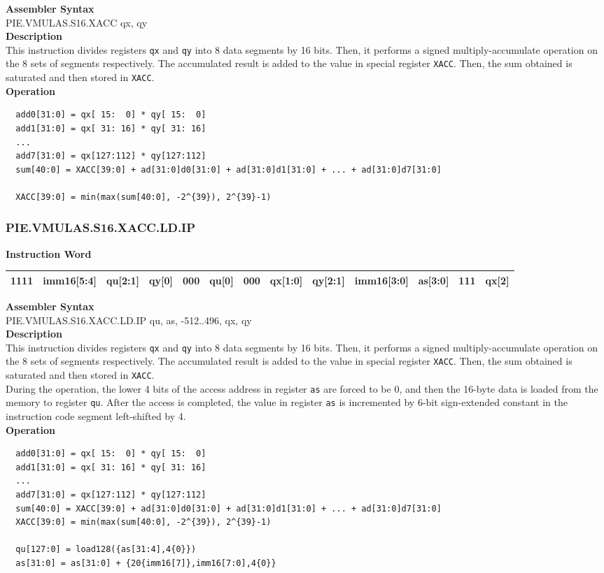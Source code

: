 \textbf{Assembler Syntax} \\
PIE.VMULAS.S16.XACC qx, qy \\
\textbf{Description} \\
This instruction divides registers \lstinline{qx} and \lstinline{qy} into 8 data segments by 16 bits. Then, it performs a signed multiply-accumulate operation on the 8 sets of segments respectively. The accumulated result is added to the value in special register \lstinline{XACC}. Then, the sum obtained is saturated and then stored in \lstinline{XACC}.\\
\textbf{Operation}
\begin{lstlisting}
  add0[31:0] = qx[ 15:  0] * qy[ 15:  0]
  add1[31:0] = qx[ 31: 16] * qy[ 31: 16]
  ...
  add7[31:0] = qx[127:112] * qy[127:112]
  sum[40:0] = XACC[39:0] + ad[31:0]d0[31:0] + ad[31:0]d1[31:0] + ... + ad[31:0]d7[31:0]

  XACC[39:0] = min(max(sum[40:0], -2^{39}), 2^{39}-1)
\end{lstlisting}

\newpage
\subsubsection{PIE.VMULAS.S16.XACC.LD.IP}\label{instruction:PIEVMULASS16XACCLDIP}
\setlength\tabcolsep{6pt}
\textbf{Instruction Word} \\
\begin{tabular}{|c|c|c|c|c|c|c|c|c|c|c|c|c|}
	\hline
	1111 & imm16[5:4] & qu[2:1] & qy[0] & 000 & qu[0] & 000 & qx[1:0] & qy[2:1] & imm16[3:0] & as[3:0] & 111 & qx[2] \\
	\hline
\end{tabular}

\textbf{Assembler Syntax} \\
PIE.VMULAS.S16.XACC.LD.IP qu, as, -512..496, qx, qy \\
\textbf{Description} \\
This instruction divides registers \lstinline{qx} and \lstinline{qy} into 8 data segments by 16 bits. Then, it performs a signed multiply-accumulate operation on the 8 sets of segments respectively. The accumulated result is added to the value in special register \lstinline{XACC}. Then, the sum obtained is saturated and then stored in \lstinline{XACC}. \\ During the operation, the lower 4 bits of the access address in register \lstinline{as} are forced to be 0, and then the 16-byte data is loaded from the memory to register \lstinline{qu}. After the access is completed, the value in register \lstinline{as} is incremented by 6-bit sign-extended constant in the instruction code segment left-shifted by 4.\\
\textbf{Operation}
\begin{lstlisting}
  add0[31:0] = qx[ 15:  0] * qy[ 15:  0]
  add1[31:0] = qx[ 31: 16] * qy[ 31: 16]
  ...
  add7[31:0] = qx[127:112] * qy[127:112]
  sum[40:0] = XACC[39:0] + ad[31:0]d0[31:0] + ad[31:0]d1[31:0] + ... + ad[31:0]d7[31:0]
  XACC[39:0] = min(max(sum[40:0], -2^{39}), 2^{39}-1)

  qu[127:0] = load128({as[31:4],4{0}})
  as[31:0] = as[31:0] + {20{imm16[7]},imm16[7:0],4{0}}
\end{lstlisting}

